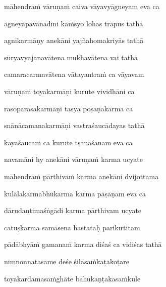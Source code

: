 māhendra\.m vāruṇa\.m caiva vāyavyāgneyam eva ca \veg\dontdisplaylinenum

āgneyapavanādīni kā\.msyo lohas trapus tathā\thinspace{\dandab} \dontdisplaylinenum

agnikarmāṇy anekāni yajñahomakriyās tathā \veg\dontdisplaylinenum

sūryavyajanavātena mukhavātena vai tathā\thinspace{\dandab} \dontdisplaylinenum

camaracarmavātena vātayantra\.m ca vāyavam \veg\dontdisplaylinenum

vāruṇa\.m toyakarmāṇi kurute vividhāni ca\thinspace{\dandab} \dontdisplaylinenum

rasoparasakarmāṇi tasya poṣaṇakarma ca \veg\dontdisplaylinenum

snānācamanakarmāṇi vastraśaucādayas tathā\thinspace{\dandab} \dontdisplaylinenum

kāyaśauca\.m ca kurute tṣānāśanam eva ca \veg\dontdisplaylinenum

navamāni hy anekāni vāruṇa\.m karma ucyate\thinspace{\dandab} \dontdisplaylinenum

māhendra\.m pārthiva\.m karma anekāni dvijottama \veg\dontdisplaylinenum

kulālakarmabhūkarma karma pāṣāṇam eva ca\thinspace{\dandab} \dontdisplaylinenum

dārudantimaśṅgādi karma pārthivam ucyate \veg\dontdisplaylinenum

catuṣkarma samāsena hastataḥ parikīrtitam\thinspace{\dandab} \dontdisplaylinenum



pādābhyā\.m gamana\.m karma diśaś ca vidiśas tathā \veg\dontdisplaylinenum

nimnonnatasame deśe śilāsa\.mkaṭakoṭare\thinspace{\dandab} \dontdisplaylinenum

toyakardamasa\.mghāte bahukaṇṭakasa\.mkule \veg\dontdisplaylinenum


